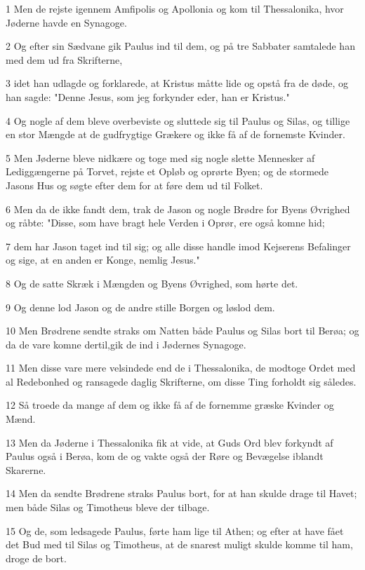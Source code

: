 \par 1 Men de rejste igennem Amfipolis og Apollonia og kom til Thessalonika, hvor Jøderne havde en Synagoge.
\par 2 Og efter sin Sædvane gik Paulus ind til dem, og på tre Sabbater samtalede han med dem ud fra Skrifterne,
\par 3 idet han udlagde og forklarede, at Kristus måtte lide og opstå fra de døde, og han sagde: "Denne Jesus, som jeg forkynder eder, han er Kristus."
\par 4 Og nogle af dem bleve overbeviste og sluttede sig til Paulus og Silas, og tillige en stor Mængde at de gudfrygtige Grækere og ikke få af de fornemste Kvinder.
\par 5 Men Jøderne bleve nidkære og toge med sig nogle slette Mennesker af Lediggængerne på Torvet, rejste et Opløb og oprørte Byen; og de stormede Jasons Hus og søgte efter dem for at føre dem ud til Folket.
\par 6 Men da de ikke fandt dem, trak de Jason og nogle Brødre for Byens Øvrighed og råbte: "Disse, som have bragt hele Verden i Oprør, ere også komne hid;
\par 7 dem har Jason taget ind til sig; og alle disse handle imod Kejserens Befalinger og sige, at en anden er Konge, nemlig Jesus."
\par 8 Og de satte Skræk i Mængden og Byens Øvrighed, som hørte det.
\par 9 Og denne lod Jason og de andre stille Borgen og løslod dem.
\par 10 Men Brødrene sendte straks om Natten både Paulus og Silas bort til Berøa; og da de vare komne dertil,gik de ind i Jødernes Synagoge.
\par 11 Men disse vare mere velsindede end de i Thessalonika, de modtoge Ordet med al Redebonhed og ransagede daglig Skrifterne, om disse Ting forholdt sig således.
\par 12 Så troede da mange af dem og ikke få af de fornemme græske Kvinder og Mænd.
\par 13 Men da Jøderne i Thessalonika fik at vide, at Guds Ord blev forkyndt af Paulus også i Berøa, kom de og vakte også der Røre og Bevægelse iblandt Skarerne.
\par 14 Men da sendte Brødrene straks Paulus bort, for at han skulde drage til Havet; men både Silas og Timotheus bleve der tilbage.
\par 15 Og de, som ledsagede Paulus, førte ham lige til Athen; og efter at have fået det Bud med til Silas og Timotheus, at de snarest muligt skulde komme til ham, droge de bort.
